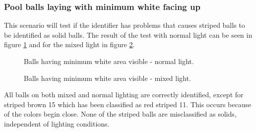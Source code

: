 \subsubsection{Pool balls laying with minimum white facing up}
This scenario will test if the identifier has problems that causes striped balls to be identified as solid balls.
The result of the test with normal light can be seen in figure \ref{fig:minnormal} and for the mixed light in figure \ref{fig:minmixed}.
\begin{figure}[H]
  \centering
  \quad
	\quad
   \caption{Balls having minimum white area visible - normal light.}
  \label{fig:minnormal}
\end{figure}

\begin{figure}[H]
  \centering
  \quad
  \quad
   \caption{Balls having minimum white area visible - mixed light.}
  \label{fig:minmixed}
\end{figure}
All balls on both mixed and normal lighting are correctly identified, except for striped brown 15 which has been classified as red striped 11. This occurs because of the colors begin close. None of the striped balls are misclassified as solids, independent of lighting conditions.

